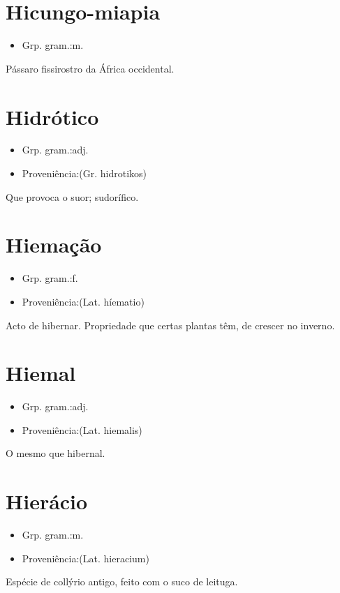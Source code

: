 \documentclass{article}
\begin{document}
\section{Hicungo-miapia}
\begin{itemize}
\item {Grp. gram.:m.}
\end{itemize}
Pássaro fissirostro da África occidental.
\section{Hidrótico}
\begin{itemize}
\item {Grp. gram.:adj.}
\end{itemize}
\begin{itemize}
\item {Proveniência:(Gr. \textunderscore hidrotikos\textunderscore )}
\end{itemize}
Que provoca o suor; sudorífico.
\section{Hiemação}
\begin{itemize}
\item {Grp. gram.:f.}
\end{itemize}
\begin{itemize}
\item {Proveniência:(Lat. \textunderscore híematio\textunderscore )}
\end{itemize}
Acto de hibernar.
Propriedade que certas plantas têm, de crescer no inverno.
\section{Hiemal}
\begin{itemize}
\item {Grp. gram.:adj.}
\end{itemize}
\begin{itemize}
\item {Proveniência:(Lat. \textunderscore hiemalis\textunderscore )}
\end{itemize}
O mesmo que \textunderscore hibernal\textunderscore .
\section{Hierácio}
\begin{itemize}
\item {Grp. gram.:m.}
\end{itemize}
\begin{itemize}
\item {Proveniência:(Lat. \textunderscore hieracium\textunderscore )}
\end{itemize}
Espécie de collýrio antigo, feito com o suco de leituga.
\end{document}
